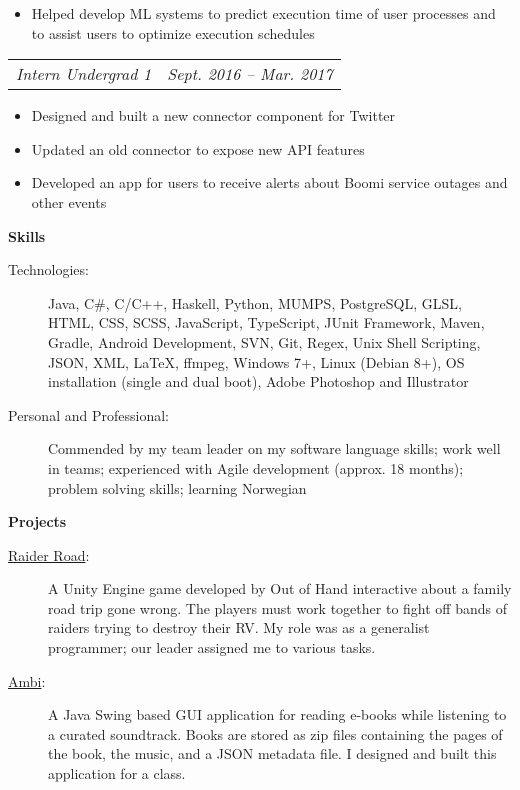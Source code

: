 \documentclass[letterpaper,11pt]{article}
\makeatletter
\newcommand{\resitem}[1]{\item #1 \vspace{-2pt}}
\newcommand{\resheading}[1]{{\large \colorbox{mygrey}{\begin{minipage}{\textwidth}{\textbf{#1 \vphantom{p\^{E}}}}\end{minipage}}}}
\newcommand{\ressubsubheading}[2]{
\begin{tabular*}{6.5in}{l@{\extracolsep{\fill}}r}
		\textit{#1} & \textit{#2} \\
\end{tabular*}\vspace{-6pt}}
\newcommand{\smallsect}[1]{{\footnotesize #1}}
\makeatother
\begin{document}
\begin{itemize}
{\begin{itemize}
			\resitem{Helped develop ML systems to predict execution time of user processes and to assist users to optimize execution schedules}
		\end{itemize}
		}
		\ressubsubheading{Intern Undergrad 1}{Sept. 2016 -- Mar. 2017}
		\smallsect{
		\begin{itemize}
			\resitem{Designed and built a new connector component for Twitter}
			\resitem{Updated an old connector to expose new API features}
			\resitem{Developed an app for users to receive alerts about Boomi service outages and other events}
		\end{itemize}
		}
\end{itemize}

\resheading{Skills}
\begin{description}
	\item[Technologies:] \smallsect{
		Java, C\#, C/C++, Haskell, Python, MUMPS, PostgreSQL, GLSL, HTML, CSS, SCSS, JavaScript, TypeScript, JUnit Framework, Maven, Gradle, Android Development, SVN, Git, Regex, Unix Shell Scripting, JSON, XML, \LaTeX, ffmpeg, Windows 7+, Linux (Debian 8+), OS installation (single and dual boot), Adobe Photoshop and Illustrator
	}
	\item[Personal and Professional:] \smallsect{
		Commended by my team leader on my software language skills; work well in teams; experienced with Agile development (approx. 18 months); problem solving skills; learning Norwegian
	}
\end{description}

\resheading{Projects}
\begin{description}
	\item[\href{https://outofhandinteractive.wordpress.com/raider-road/}{Raider Road}:] \smallsect{
		A Unity Engine game developed by Out of Hand interactive about a family road trip gone wrong. The players must work together to fight off bands of raiders trying to destroy their RV. My role was as a generalist programmer; our leader assigned me to various tasks.
	}
	\item[\href{https://github.com/t-highfill/Ambi}{Ambi}:] \smallsect{
		A Java Swing based GUI application for reading e-books while listening to a curated soundtrack. Books are stored as zip files containing the pages of the book, the music, and a JSON metadata file. I designed and built this application for a class.
	}
\end{description}
\end{document}
